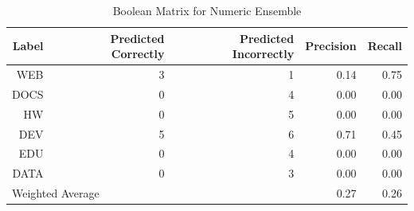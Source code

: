 \begin{table}[h]
\centering
\caption{Boolean Matrix for Numeric Ensemble}
\label{boolean_matrix_numeric_ensemble}
\begin{tabular}{|r|r|r|r|r|}
 \hline
 Label & Predicted Correctly & Predicted Incorrectly & Precision & Recall \\ \hline
 WEB & 3 & 1 & 0.14 & 0.75 \\ \hline
 DOCS & 0 & 4 & 0.00 & 0.00 \\ \hline
 HW & 0 & 5 & 0.00 & 0.00 \\ \hline
 DEV & 5 & 6 & 0.71 & 0.45 \\ \hline
 EDU & 0 & 4 & 0.00 & 0.00 \\ \hline
 DATA & 0 & 3 & 0.00 & 0.00 \\ \hline
 \multicolumn{3}{|l|}{Weighted Average} & 0.27 & 0.26 \\ \hline
 \end{tabular}
 \end{table}
